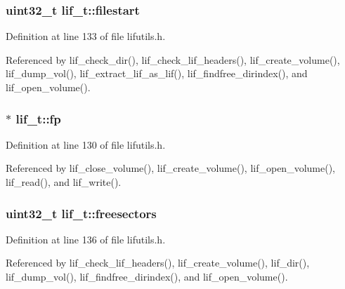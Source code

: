 \subsubsection[{\texorpdfstring{filestart}{filestart}}]{\setlength{\rightskip}{0pt plus 5cm}uint32\+\_\+t lif\+\_\+t\+::filestart}\hypertarget{structlif__t_a3c1bcc66b694d07ebc304ef7cb66b4ef}{}\label{structlif__t_a3c1bcc66b694d07ebc304ef7cb66b4ef}


Definition at line 133 of file lifutils.\+h.



Referenced by lif\+\_\+check\+\_\+dir(), lif\+\_\+check\+\_\+lif\+\_\+headers(), lif\+\_\+create\+\_\+volume(), lif\+\_\+dump\+\_\+vol(), lif\+\_\+extract\+\_\+lif\+\_\+as\+\_\+lif(), lif\+\_\+findfree\+\_\+dirindex(), and lif\+\_\+open\+\_\+volume().

\subsubsection[{\texorpdfstring{fp}{fp}}]{$\ast$ lif\+\_\+t\+::fp}\hypertarget{structlif__t_ad679ba16ca21371a649981a4cca9e64c}{}\label{structlif__t_ad679ba16ca21371a649981a4cca9e64c}


Definition at line 130 of file lifutils.\+h.



Referenced by lif\+\_\+close\+\_\+volume(), lif\+\_\+create\+\_\+volume(), lif\+\_\+open\+\_\+volume(), lif\+\_\+read(), and lif\+\_\+write().

\subsubsection[{\texorpdfstring{freesectors}{freesectors}}]{\setlength{\rightskip}{0pt plus 5cm}uint32\+\_\+t lif\+\_\+t\+::freesectors}\hypertarget{structlif__t_a1fc11461eb5643d84e229772f7623152}{}\label{structlif__t_a1fc11461eb5643d84e229772f7623152}


Definition at line 136 of file lifutils.\+h.



Referenced by lif\+\_\+check\+\_\+lif\+\_\+headers(), lif\+\_\+create\+\_\+volume(), lif\+\_\+dir(), lif\+\_\+dump\+\_\+vol(), lif\+\_\+findfree\+\_\+dirindex(), and lif\+\_\+open\+\_\+volume().

